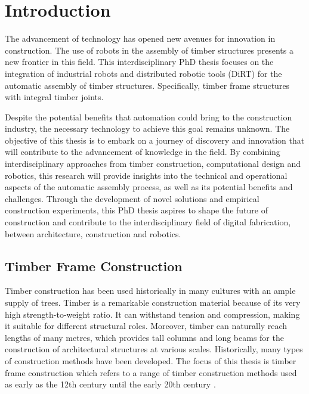 \chapter{Introduction}
\label{chapter:introduction}

The advancement of technology has opened new avenues for innovation in construction.
The use of robots in the assembly of timber structures presents a new frontier in this field.
This interdisciplinary PhD thesis focuses on the integration of industrial robots and distributed robotic tools (DiRT) for the automatic assembly of timber structures.
Specifically, timber frame structures with integral timber joints. 

Despite the potential benefits that automation could bring to the construction industry, the necessary technology to achieve this goal remains unknown. The objective of this thesis is to embark on a journey of discovery and innovation that will contribute to the advancement of knowledge in the field.
By combining interdisciplinary approaches from timber construction, computational design and robotics, this research will provide insights into the technical and operational aspects of the automatic assembly process, as well as its potential benefits and challenges.
Through the development of novel solutions and empirical construction experiments, this PhD thesis aspires to shape the future of construction and contribute to the interdisciplinary field of digital fabrication, between architecture, construction and robotics.

\section{Timber Frame Construction}
\label{section:introduction_timber_frame_construction}

Timber construction has been used historically in many cultures with an ample supply of trees.
Timber is a remarkable construction material because of its very high strength-to-weight ratio.
It can withstand tension and compression, making it suitable for different structural roles. Moreover, timber can naturally reach lengths of many metres, which provides tall columns and long beams for the construction of architectural structures at various scales.
Historically, many types of construction methods have been developed. The focus of this thesis is timber frame construction which refers to a range of timber construction methods used as early as the 12th century until the early 20th century \parencite{sobonTimberFrameConstruction1984}.

